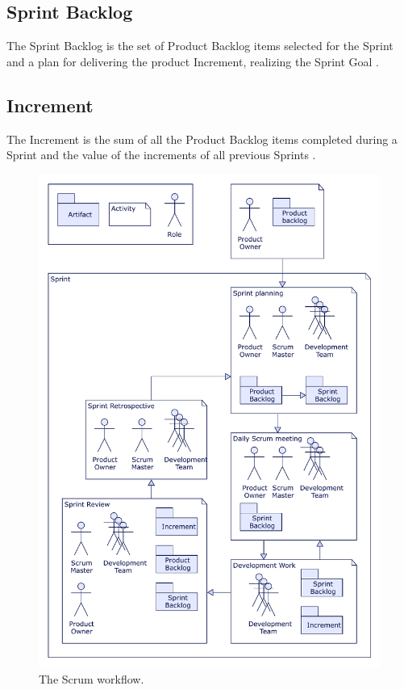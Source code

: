 \subsection{Sprint Backlog}
The Sprint Backlog is the set of Product Backlog items selected for the Sprint
and a plan for delivering the product Increment, realizing the Sprint Goal \parencite{TheScrumGuide}.

\subsection{Increment}
The Increment is the sum of all the Product Backlog items completed during a 
Sprint and the value of the increments of all previous Sprints \parencite{TheScrumGuide}.

\begin{figure}[H]
	\centering
	\includegraphics[scale=0.75]{Figures/Scrum_workflow.pdf}
	\decoRule
	\caption{The Scrum workflow.}
	\label{fig:ScrumWorkflow}
\end{figure}